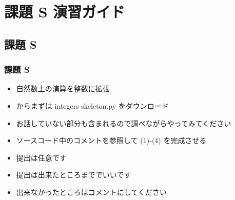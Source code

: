 %
%
\section{課題 S 演習ガイド}
\subsection{課題 S}
\begin{frame}[containsverbatim, shrink, label=quizS]
\frametitle{課題 S}
  \begin{itemize}
\item 自然数上の演算を整数に拡張
\item \href{https://sites.google.com/presystems.xyz/elementarycs/top}{} からまずは integers-skeleton.py をダウンロード
\item お話していない部分も含まれるので調べながらやってみてください
\item ソースコード中のコメントを参照して (1)-(4) を完成させる
\item 提出は任意です
\item 提出は出来たところまででいいです
\item 出来なかったところはコメントにしてください
  \end{itemize}
\end{frame}
